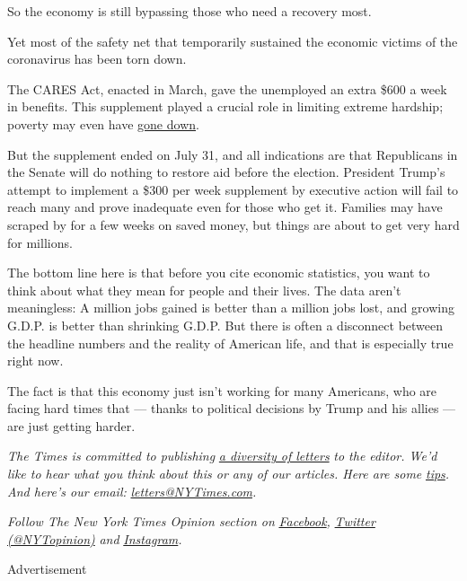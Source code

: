 So the economy is still bypassing those who need a recovery most.

Yet most of the safety net that temporarily sustained the economic
victims of the coronavirus has been torn down.

The CARES Act, enacted in March, gave the unemployed an extra \$600 a
week in benefits. This supplement played a crucial role in limiting
extreme hardship; poverty may even have
\href{https://www.nytimes3xbfgragh.onion/2020/06/21/us/politics/coronavirus-poverty.html}{gone
down}.

But the supplement ended on July 31, and all indications are that
Republicans in the Senate will do nothing to restore aid before the
election. President Trump's attempt to implement a \$300 per week
supplement by executive action will fail to reach many and prove
inadequate even for those who get it. Families may have scraped by for a
few weeks on saved money, but things are about to get very hard for
millions.

The bottom line here is that before you cite economic statistics, you
want to think about what they mean for people and their lives. The data
aren't meaningless: A million jobs gained is better than a million jobs
lost, and growing G.D.P. is better than shrinking G.D.P. But there is
often a disconnect between the headline numbers and the reality of
American life, and that is especially true right now.

The fact is that this economy just isn't working for many Americans, who
are facing hard times that --- thanks to political decisions by Trump
and his allies --- are just getting harder.

\emph{The Times is committed to publishing}
\href{https://www.nytimes3xbfgragh.onion/2019/01/31/opinion/letters/letters-to-editor-new-york-times-women.html}{\emph{a
diversity of letters}} \emph{to the editor. We'd like to hear what you
think about this or any of our articles. Here are some}
\href{https://help.nytimes3xbfgragh.onion/hc/en-us/articles/115014925288-How-to-submit-a-letter-to-the-editor}{\emph{tips}}\emph{.
And here's our email:}
\href{mailto:letters@NYTimes.com}{\emph{letters@NYTimes.com}}\emph{.}

\emph{Follow The New York Times Opinion section on}
\href{https://www.facebookcorewwwi.onion/nytopinion}{\emph{Facebook}}\emph{,}
\href{http://twitter.com/NYTOpinion}{\emph{Twitter (@NYTopinion)}}
\emph{and}
\href{https://www.instagram.com/nytopinion/}{\emph{Instagram}}\emph{.}

Advertisement

